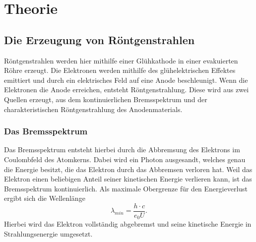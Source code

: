 \section{Theorie}
\label{sec:Theorie}

\subsection{Die Erzeugung von Röntgenstrahlen}
Röntgenstrahlen werden hier mithilfe einer Glühkathode in einer evakuierten Röhre
erzeugt. Die Elektronen werden mithilfe des glühelektrischen Effektes emittiert und
durch ein elektrisches Feld auf eine Anode beschleunigt. Wenn die Elektronen die
Anode erreichen, entsteht Röntgenstrahlung. Diese wird aus zwei Quellen erzeugt,
aus dem kontinuierlichen Bremsspektrum und der charakteristischen Röntgenstrahlung
des Anodenmaterials.
\subsubsection{Das Bremsspektrum}
Das Bremsspektrum entsteht hierbei durch die Abbremsung des Elektrons im
Coulombfeld des Atomkerns. Dabei wird ein Photon ausgesandt, welches genau die
Energie besitzt, die das Elektron durch das Abbremsen verloren hat. Weil das
Elektron einen beliebigen Anteil seiner kinetischen Energie verlieren kann, ist
das Bremsspektrum kontinuierlich. Als maximale Obergrenze für den Energieverlust
ergibt sich die Wellenlänge
\begin{equation*}
  \lambda_{min} = \frac{h \cdot c}{e_0 U}.
\end{equation*}
Hierbei wird das Elektron vollständig abgebremst und seine kinetische Energie in
Strahlungsenergie umgesetzt.

